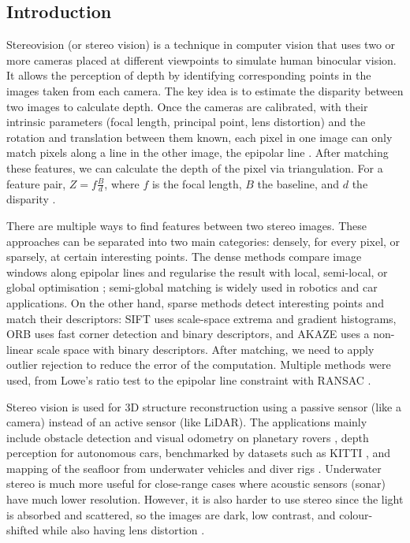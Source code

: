 \documentclass[12pt]{article}
\begin{document}
\subsection{Introduction}
\hspace*{2em}Stereovision (or stereo vision) is a technique in computer vision that uses two or more cameras placed at different viewpoints to simulate human binocular vision. It allows the perception of depth by identifying corresponding points in the images taken from each camera. The key idea is to estimate the disparity between two images to calculate depth. Once the cameras are calibrated, with their intrinsic parameters (focal length, principal point, lens distortion) and the rotation and translation between them known, each pixel in one image can only match pixels along a line in the other image, the epipolar line \cite{hartley2004multiple}. After matching these features, we can calculate the depth of the pixel via triangulation. For a feature pair, \(Z = f\frac{B}{d}\), where \(f\) is the focal length, \(B\) the baseline, and \(d\) the disparity \cite{hartley2004multiple}.

There are multiple ways to find features between two stereo images. These approaches can be separated into two main categories: densely, for every pixel, or sparsely, at certain interesting points. The dense methods compare image windows along epipolar lines and regularise the result with local, semi-local, or global optimisation \cite{scharstein2002taxonomy, hirschmuller2008stereo}; semi-global matching \cite{hirschmuller2008stereo} is widely used in robotics and car applications. On the other hand, sparse methods detect interesting points and match their descriptors: SIFT \cite{lowe2004distinctive} uses scale-space extrema and gradient histograms, ORB \cite{rublee2011orb} uses fast corner detection and binary descriptors, and AKAZE \cite{alcantarilla2013fast} uses a non-linear scale space with binary descriptors. After matching, we need to apply outlier rejection to reduce the error of the computation. Multiple methods were used, from Lowe's ratio test \cite{lowe2004distinctive} to the epipolar line constraint with RANSAC \cite{fischler1981ransac}.

Stereo vision is used for 3D structure reconstruction using a passive sensor (like a camera) instead of an active sensor (like LiDAR). The applications mainly include obstacle detection and visual odometry on planetary rovers \cite{maimone2007visual}, depth perception for autonomous cars, benchmarked by datasets such as KITTI \cite{geiger2012kitti}, and mapping of the seafloor from underwater vehicles and diver rigs \cite{johnson2010generation, pizarro2009large}. Underwater stereo is much more useful for close-range cases where acoustic sensors (sonar) have much lower resolution. However, it is also harder to use stereo since the light is absorbed and scattered, so the images are dark, low contrast, and colour-shifted while also having lens distortion \cite{johnson2010generation}.
\end{document}
